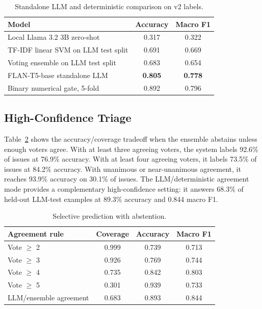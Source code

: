 \documentclass[conference]{IEEEtran}
\begin{document}
\begin{table}[t]
\centering
\caption{Standalone LLM and deterministic comparison on v2 labels.}
\label{tab:llm}
\begin{tabular}{lcc}
\toprule
Model & Accuracy & Macro F1 \\
\midrule
Local Llama 3.2 3B zero-shot & 0.317 & 0.322 \\
TF-IDF linear SVM on LLM test split & 0.691 & 0.669 \\
Voting ensemble on LLM test split & 0.683 & 0.654 \\
FLAN-T5-base standalone LLM & \textbf{0.805} & \textbf{0.778} \\
Binary numerical gate, 5-fold & 0.892 & 0.796 \\
\bottomrule
\end{tabular}
\end{table}

\subsection{High-Confidence Triage}

Table~\ref{tab:abstain} shows the accuracy/coverage tradeoff when the ensemble
abstains unless enough voters agree. With at least three agreeing voters, the
system labels 92.6\% of issues at 76.9\% accuracy. With at least four agreeing
voters, it labels 73.5\% of issues at 84.2\% accuracy. With unanimous or
near-unanimous agreement, it reaches 93.9\% accuracy on 30.1\% of issues. The
LLM/deterministic agreement mode provides a complementary high-confidence
setting: it answers 68.3\% of held-out LLM-test examples at 89.3\% accuracy
and 0.844 macro F1.

\begin{table}[t]
\centering
\caption{Selective prediction with abstention.}
\label{tab:abstain}
\begin{tabular}{lccc}
\toprule
Agreement rule & Coverage & Accuracy & Macro F1 \\
\midrule
Vote $\geq$ 2 & 0.999 & 0.739 & 0.713 \\
Vote $\geq$ 3 & 0.926 & 0.769 & 0.744 \\
Vote $\geq$ 4 & 0.735 & 0.842 & 0.803 \\
Vote $\geq$ 5 & 0.301 & 0.939 & 0.733 \\
LLM/ensemble agreement & 0.683 & 0.893 & 0.844 \\
\bottomrule
\end{tabular}
\end{table}
\end{document}
